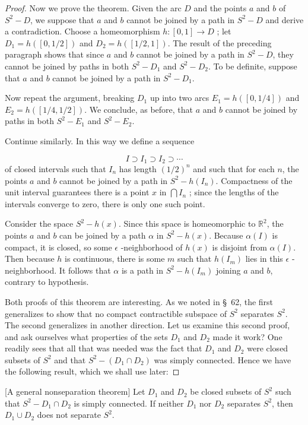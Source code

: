 \begin{proof}
Now we prove the theorem. Given the arc \(D\) and the points \(a\) and \(b\) of \(S^{2} - D\), we suppose that \(a\) and \(b\) cannot be joined by a path in \(S^{2} - D\) and derive a contradiction. Choose a homeomorphism \(h : [ {0,1}] \rightarrow D\) ; let \(D_{1} = h( [ {0,1/2}] )\) and \(D_{2} = h( [ {1/2,1}] )\). The result of the preceding paragraph shows that since \(a\) and \(b\) cannot be joined by a path in \(S^{2} - D\), they cannot be joined by paths in both \(S^{2} - D_{1}\) and \(S^{2} - D_{2}\). To be definite, suppose that \(a\) and \(b\) cannot be joined by a path in \(S^{2} - D_{1}\).

Now repeat the argument, breaking \(D_{1}\) up into two arcs \(E_{1} = h( [ {0,1/4}] )\) and \(E_{2} = h( [ {1/4,1/2}] )\). We conclude, as before, that \(a\) and \(b\) cannot be joined by paths in both \(S^{2} - E_{1}\) and \(S^{2} - E_{2}\).

Continue similarly. In this way we define a sequence

\[
I \supset {I}_{1} \supset {I}_{2} \supset \cdots
\]
of closed intervals such that \(I_{n}\) has length \({( 1/2) }^{n}\) and such that for each \(n\), the points \(a\) and \(b\) cannot be joined by a path in \(S^{2} - h( I_{n})\). Compactness of the unit interval guarantees there is a point \(x\) in \(\bigcap {I}_{n}\) ; since the lengths of the intervals converge to zero, there is only one such point.

Consider the space \(S^{2} - h(x)\). Since this space is homeomorphic to \(\mathbb{R}^{2}\), the points \(a\) and \(b\) can be joined by a path \(\alpha\) in \(S^{2} - h(x)\). Because \(\alpha ( I)\) is compact, it is closed, so some \(\epsilon\) -neighborhood of \(h(x)\) is disjoint from \(\alpha ( I)\). Then because \(h\) is continuous, there is some \(m\) such that \(h( I_{m})\) lies in this \(\epsilon\) -neighborhood. It follows that \(\alpha\) is a path in \(S^{2} - h( I_{m})\) joining \(a\) and \(b\), contrary to hypothesis.

Both proofs of this theorem are interesting. As we noted in \S\ 62, the first generalizes to show that no compact contractible subspace of \(S^{2}\) separates \(S^{2}\). The second generalizes in another direction. Let us examine this second proof, and ask ourselves what properties of the sets \(D_{1}\) and \(D_{2}\) made it work? One readily sees that all that was needed was the fact that \(D_{1}\) and \(D_{2}\) were closed subsets of \(S^{2}\) and that \(S^{2} - ( {D_{1} \cap {D}_{2}})\) was simply connected. Hence we have the following result, which we shall use later:
\end{proof}
\begin{theorem}
\label{thm:\thetheorem}[A general nonseparation theorem]
Let \(D_{1}\) and \(D_{2}\) be closed subsets of \(S^{2}\) such that \(S^{2} - D_{1} \cap {D}_{2}\) is simply connected. If neither \(D_{1}\) nor \(D_{2}\) separates \(S^{2}\), then \(D_{1} \cup {D}_{2}\) does not separate \(S^{2}\).
\end{theorem}

